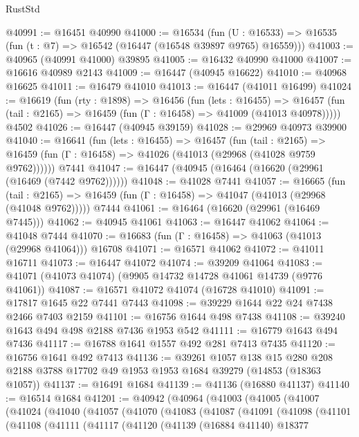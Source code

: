 \begin{lexlean}{RustStd}
\begin{coremodule}
@40991 := @16451 @40990
@41000 := @16534
    (fun (U : @16533) => @16535 (fun (t : @7) => @16542 (@16447 (@16548 @39897 @9765) @16559)))
@41003 := @40965 (@40991 @41000) @39895
@41005 := @16432 @40990 @41000
@41007 := @16616 @40989 @2143
@41009 := @16447 (@40945 @16622)
@41010 := @40968 @16625
@41011 := @16479 @41010
@41013 := @16447 (@41011 @16499)
@41024 := @16619
    (fun (rty : @1898) =>
    @16456
      (fun (lets : @16455) =>
      @16457 (fun (tail : @2165) => @16459 (fun (Γ : @16458) => @41009 (@41013 @40978)))))
    @4502
@41026 := @16447 (@40945 @39159)
@41028 := @29969 @40973 @39900
@41040 := @16641
    (fun (lets : @16455) =>
    @16457
      (fun (tail : @2165) =>
      @16459 (fun (Γ : @16458) => @41026 (@41013 (@29968 (@41028 @9759 @9762))))))
    @7441
@41047 := @16447 (@40945 (@16464 (@16620 (@29961 (@16469 (@7442 @9762))))))
@41048 := @41028 @7441
@41057 := @16665
    (fun (tail : @2165) => @16459 (fun (Γ : @16458) => @41047 (@41013 (@29968 (@41048 @9762)))))
    @7444
@41061 := @16464 (@16620 (@29961 (@16469 @7445)))
@41062 := @40945 @41061
@41063 := @16447 @41062
@41064 := @41048 @7444
@41070 := @16683 (fun (Γ : @16458) => @41063 (@41013 (@29968 @41064))) @16708
@41071 := @16571 @41062
@41072 := @41011 @16711
@41073 := @16447 @41072
@41074 := @39209 @41064
@41083 := @41071 (@41073 @41074) (@9905 @14732 @14728 @41061 @14739 (@9776 @41061))
@41087 := @16571 @41072 @41074 (@16728 @41010)
@41091 := @17817 @1645 @22 @7441 @7443
@41098 := @39229 @1644 @22 @24 @7438 @2466 @7403 @2159
@41101 := @16756 @1644 @498 @7438
@41108 := @39240 @1643 @494 @498 @2188 @7436 @1953 @542
@41111 := @16779 @1643 @494 @7436
@41117 := @16788 @1641 @1557 @492 @281 @7413 @7435
@41120 := @16756 @1641 @492 @7413
@41136 := @39261
    @1057
    @138
    @15
    @280
    @208
    @2188
    @3788
    @17702
    @49
    @1953
    @1953
    @1684
    @39279
    (@14853 (@18363 @1057))
@41137 := @16491 @1684
@41139 := @41136 (@16880 @41137)
@41140 := @16514 @1684
@41201 := @40942
    (@40964
      (@41003
        (@41005
          (@41007
            (@41024
              (@41040
                (@41057
                  (@41070
                    (@41083
                      (@41087
                        (@41091
                          (@41098
                            (@41101
                              (@41108
                                (@41111
                                  (@41117
                                    (@41120
                                      (@41139
                                        (@16884 @41140)
                                        @18377

\end{coremodule}
\end{lexlean}
